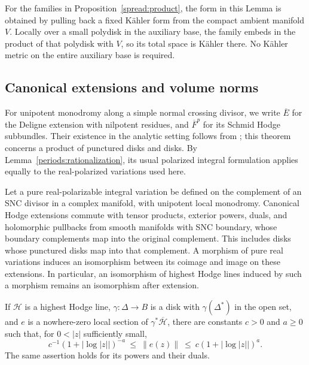 For the families in Proposition~\ref{spread:product}, the form in this
Lemma is obtained by pulling back a fixed K\"ahler form from the compact
ambient manifold $V$.  Locally over a small polydisk in the auxiliary base,
the family embeds in the product of that polydisk with $V$, so its total
space is K\"ahler there.  No K\"ahler metric on the entire auxiliary base
is required.

\subsection{Canonical extensions and volume norms}

For unipotent monodromy along a simple normal crossing divisor, we write
$\overline E$ for the Deligne extension with nilpotent residues, and
$\overline F^p$ for its Schmid Hodge subbundles.  Their existence in the
analytic setting follows from \cite[Theorem~4.12]{Schmid73}; this theorem
concerns a product of punctured disks and disks.  By
Lemma~\ref{periods:rationalization}, its usual polarized integral
formulation applies equally to the real-polarized variations used here.

\begin{lemma}
\label{periods:extensions}
Let a pure real-polarizable integral variation be defined on the complement
of an SNC divisor in a complex manifold, with unipotent local monodromy.
Canonical Hodge extensions commute with tensor products, exterior powers,
duals, and holomorphic pullbacks from smooth manifolds with SNC boundary,
whose boundary complements map into the original complement.  This
includes disks whose punctured disks map into that complement.
A morphism of pure real variations induces an isomorphism
between its coimage and image on these extensions.  In particular, an
isomorphism of highest Hodge lines induced by such a morphism remains an
isomorphism after extension.

If $\mathcal H$ is a highest Hodge line, $\gamma:\Delta\to B$ is a disk
with $\gamma(\Delta^*)$ in the open set, and $e$ is a nowhere-zero local
section of $\gamma^*\overline{\mathcal H}$, there are constants $c>0$ and
$a\geq0$ such that, for $0<|z|$ sufficiently small,
\begin{equation}\label{periods:logbounds}
 c^{-1}(1+|\log|z||)^{-a}
 \ \leq\ \|e(z)\|\ \leq\
 c(1+|\log|z||)^a.
\end{equation}
The same assertion holds for its powers and their duals.
\end{lemma}

